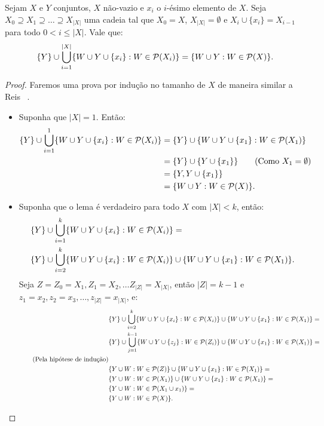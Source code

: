 \begin{mylemma}
\label{lemma:lower_forest}
Sejam $X$ e $Y$ conjuntos, $X$ não-vazio e $x_i$ o $i$-ésimo 
elemento de $X$. Seja $X_0 \supseteq X_1 \supseteq \dots \supseteq 
X_{|X|}$ uma cadeia tal que $X_0 = X$, $X_{|X|} = \emptyset$ e $X_{i} 
\cup \{x_i\} = X_{i - 1}$ para todo $0 < i \leq |X|$. Vale que:
\begin{align*}
\{ Y \} \cup \bigcup_{i = 1}^{|X|} \{W \cup Y \cup \{x_i\} : W \in \mathcal{P} (X_i)\} = \{W \cup Y : W \in \mathcal{P} (X)\}.
\end{align*}
\end{mylemma} 

\begin{proof}
Faremos uma prova por indução no tamanho de $X$ de maneira similar a
Reis ~\cite{Rei12}.

\begin{itemize}
\item{Suponha que $|X| = 1$. Então:}
\begin{align*}
    \{Y\} \cup \bigcup_{i = 1}^{1} \{W \cup Y \cup \{x_i\} : W \in \mathcal{P} (X_i)\} & = 
    \{Y\} \cup \{W \cup Y \cup \{x_1\} : W \in \mathcal{P} (X_1)\} & \\
    & = \{Y\} \cup \{Y \cup \{x_1\}\} \tag{Como $X_1 = \emptyset$} \\
    & = \{Y, Y \cup \{x_1\}\} \\
    & = \{W \cup Y : W \in \mathcal{P} (X)\}.
\end{align*}

\item{Suponha que o lema é verdadeiro para todo $X$ com $|X| < k$, 
    então:}
\begin{align*}
    & \{Y\} \cup \bigcup_{i = 1}^{k} \{W \cup Y \cup \{x_i\} : W \in \mathcal{P} (X_i)\} = \\
    & \{Y\} \cup \bigcup_{i = 2}^{k} \{W \cup Y \cup \{x_i\} : W \in \mathcal{P} (X_i)\} \cup \{W \cup Y \cup \{x_1\} : W \in \mathcal{P} (X_1) \}.
\end{align*}
Seja $Z = Z_0 = X_1, Z_1 = X_2, \dots Z_{|Z|} = X_{|X|}$, então
$|Z| = k - 1$ e $z_1 = x_2, z_2 = x_3, \dots, z_{|Z|} = x_{|X|}$, e:
\begin{align*}
    & \{Y\} \cup \bigcup_{i = 2}^{k} \{W \cup Y \cup \{x_i\} : W \in \mathcal{P} (X_i)\} \cup \{W \cup Y \cup \{x_1\} : W \in \mathcal{P} (X_1) \} =\\
    & \{Y\} \cup \bigcup_{j = 1}^{k - 1} \{W \cup Y \cup \{z_j\} : W \in \mathcal{P} (Z_i)\} \cup \{W \cup Y \cup \{x_1\} : W \in \mathcal{P} (X_1) \} =\\
    \tag{Pela hipótese de indução}  \\ 
    & \{Y \cup W : W \in \mathcal{P} (Z)\} \cup \{W \cup Y \cup \{x_1\} : W \in \mathcal{P} (X_1) \} =  \\
    & \{Y \cup W : W \in \mathcal{P} (X_1)\} \cup \{W \cup Y \cup \{x_1\} : W \in \mathcal{P} (X_1) \} =  \\
    & \{Y \cup W : W \in \mathcal{P} (X_1 \cup {x_1})\} = \\
    & \{Y \cup W : W \in \mathcal{P} (X)\}.
\end{align*}
\end{itemize}
\end{proof}

